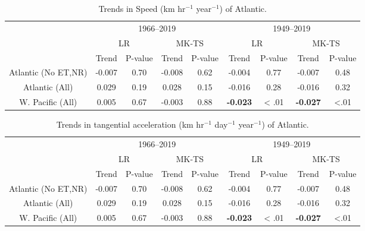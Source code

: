 \documentclass[wcd,manuscript]{copernicus}
\begin{document}
\begin{table*}[t]
\caption{Trends in Speed (km hr$^{-1}$ year$^{-1}$) of Atlantic.}

\begin{tabular}{|c|cccc|cccc|}
\hline
& \multicolumn{4}{|c|}{1966--2019}& \multicolumn{4}{|c|}{1949--2019}\\
& \multicolumn{2}{c}{LR} & \multicolumn{2}{c|}{MK-TS}& \multicolumn{2}{c}{LR} & \multicolumn{2}{c|}{MK-TS}\\
& Trend & P-value & Trend & P-value & Trend & P-value & Trend & P-value\\
\hline
Atlantic (No ET,NR)  & -0.007 & 0.70 & -0.008 & 0.62 & -0.004 & 0.77 & -0.007 & 0.48\\
\hline

Atlantic (All) &  0.029 & 0.19 &  0.028 & 0.15  & -0.016 & 0.28 & -0.016 & 0.32\\

\hline

W. Pacific (All) &  0.005 & 0.67 & -0.003 & 0.88 & \bf{-0.023} & < .01 & \bf{-0.027} & <.01\\

\hline

\end{tabular}
\label{tab:ATLSA}
\end{table*}


\begin{table*}[t]
\caption{Trends in tangential acceleration (km hr$^{-1}$ day$^{-1}$ year$^{-1}$) of Atlantic.}

\begin{tabular}{|c|cccc|cccc|}
\hline
& \multicolumn{4}{|c|}{1966--2019}& \multicolumn{4}{|c|}{1949--2019}\\
& \multicolumn{2}{c}{LR} & \multicolumn{2}{c|}{MK-TS}& \multicolumn{2}{c}{LR} & \multicolumn{2}{c|}{MK-TS}\\
& Trend & P-value & Trend & P-value & Trend & P-value & Trend & P-value\\
\hline
Atlantic (No ET,NR)  & -0.007 & 0.70 & -0.008 & 0.62 & -0.004 & 0.77 & -0.007 & 0.48\\
\hline

Atlantic (All) &  0.029 & 0.19 &  0.028 & 0.15  & -0.016 & 0.28 & -0.016 & 0.32\\

\hline

W. Pacific (All) &  0.005 & 0.67 & -0.003 & 0.88 & \bf{-0.023} & < .01 & \bf{-0.027} & <.01\\

\hline

\end{tabular}
\label{tab:ATLSA}
\end{table*}
\end{document}
